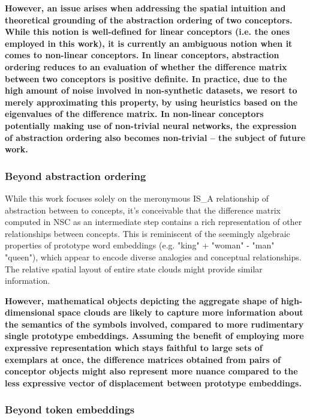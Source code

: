 \textbf{However, an issue arises when addressing the spatial intuition and theoretical grounding of the abstraction ordering of two conceptors. While this notion is well-defined for linear conceptors (i.e. the ones employed in this work), it is currently an ambiguous notion when it comes to non-linear conceptors. In linear conceptors, abstraction ordering reduces to an evaluation of whether the difference matrix between two conceptors is positive definite. In practice, due to the high amount of noise involved in non-synthetic datasets, we resort to merely approximating this property, by using heuristics based on the eigenvalues of the difference matrix. In non-linear conceptors potentially making use of non-trivial neural networks, the expression of abstraction ordering also becomes non-trivial -- the subject of future work.} 

\subsubsection{Beyond abstraction ordering}

While this work focuses solely on the meronymous IS\_A relationship of abstraction between to concepts, it's conceivable that the difference matrix computed in NSC as an intermediate step contains a rich representation of other relationships between concepts. This is reminiscent of the seemingly algebraic properties of prototype word embeddings (e.g. "king" + "woman" - "man" ~ "queen"), which appear to encode diverse analogies and conceptual relationships. The relative spatial layout of entire state clouds might provide similar information.

\textbf{However, mathematical objects depicting the aggregate shape of high-dimensional space clouds are likely to capture more information about the semantics of the symbols involved, compared to more rudimentary single prototype embeddings. Assuming the benefit of employing more expressive representation which stays faithful to large sets of exemplars at once, the difference matrices obtained from pairs of conceptor objects might also represent more nuance compared to the less expressive vector of displacement between prototype embeddings.} 

\subsubsection{Beyond token embeddings}

